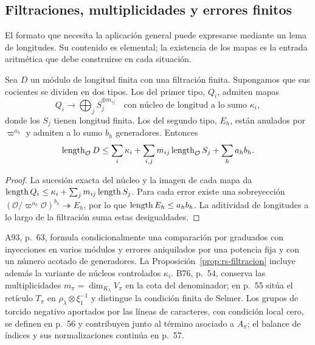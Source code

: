 \subsection{Filtraciones, multiplicidades y errores finitos}

El formato que necesita la aplicación general puede expresarse
mediante un lema de longitudes. Su contenido es elemental;
la existencia de los mapas es la entrada aritmética que debe
construirse en cada situación.

\begin{proposicion}
\label{prop:rs-filtracion}
Sea $D$ un módulo de longitud finita con una filtración finita.
Supongamos que sus cocientes se dividen en dos tipos. Los del
primer tipo, $Q_i$, admiten mapas
\begin{equation}
 Q_i\longrightarrow\bigoplus_j S_j^{\oplus m_{ij}}
 \quad\text{con núcleo de longitud a lo sumo }\kappa_i,
 \label{eq:rs-graduados}
\end{equation}
donde los $S_j$ tienen longitud finita. Los del segundo tipo,
$E_h$, están anulados por $\varpi^{a_h}$ y admiten a lo sumo
$b_h$ generadores. Entonces
\begin{equation}
 \operatorname{length}_{\mathcal O}D
 \le\sum_i\kappa_i+
       \sum_{i,j}m_{ij}\operatorname{length}_{\mathcal O}S_j+
       \sum_h a_h b_h.
 \label{eq:rs-filtracion}
\end{equation}
\end{proposicion}

\begin{proof}
La sucesión exacta del núcleo y la imagen de cada mapa da
$\operatorname{length} Q_i\le\kappa_i+\sum_jm_{ij}\operatorname{length} S_j$.
Para cada error existe una sobreyección
$(\mathcal O/\varpi^{a_h}\mathcal O)^{b_h}\twoheadrightarrow E_h$,
por lo que $\operatorname{length} E_h\le a_hb_h$.
La aditividad de longitudes a lo largo de la filtración suma
estas desigualdades.
\end{proof}

A93, p.~63, formula condicionalmente una comparación por graduados
con inyecciones en varios módulos y errores aniquilados por una
potencia fija y con un número acotado de generadores.
La Proposición~\ref{prop:rs-filtracion} incluye además la variante
de núcleos controlados $\kappa_i$. B76, p.~54, conserva las
multiplicidades $m_\pi=\dim_{K_\lambda}V_\pi$ en la cota
del denominador; en p.~55
sitúa el retículo $T_\pi$ en
$\rho_\lambda\otimes\xi_1^{-1}$ y distingue la condición
finita de Selmer. Los grupos de torcido negativo
aportados por las líneas de caracteres, con condición local cero,
se definen en p.~56 y contribuyen junto al término asociado a
$A_\pi$; el balance de índices y sus normalizaciones continúa
en p.~57.

